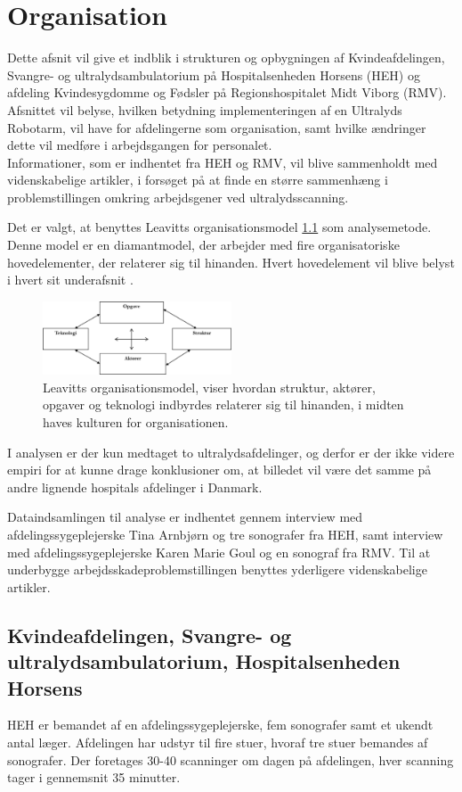 \chapter{Organisation}
Dette afsnit vil give et indblik i strukturen og opbygningen af Kvindeafdelingen, Svangre- og ultralydsambulatorium på Hospitalsenheden Horsens (HEH) og afdeling Kvindesygdomme og Fødsler på Regionshospitalet Midt Viborg (RMV). Afsnittet vil belyse, hvilken betydning implementeringen af en Ultralyds Robotarm, vil have for afdelingerne som organisation, samt hvilke ændringer dette vil medføre i arbejdsgangen for personalet. \\
Informationer, som er indhentet fra HEH og RMV, vil blive sammenholdt med videnskabelige artikler, i forsøget på at finde en større sammenhæng i problemstillingen omkring arbejdsgener ved ultralydsscanning. 

Det er valgt, at benyttes Leavitts organisationsmodel \ref{LeavittModel} som analysemetode. Denne model er en diamantmodel, der arbejder med fire organisatoriske hovedelementer, der relaterer sig til hinanden. Hvert hovedelement vil blive belyst i hvert sit underafsnit \cite{Leavitt}.

\begin{figure}[h!]\centering
	\includegraphics[width = 0.5\textwidth]{Figurer/LeavittModel}
	\caption{Leavitts organisationsmodel, viser hvordan struktur, aktører, opgaver og teknologi indbyrdes relaterer sig til hinanden, i midten haves kulturen for organisationen.}
	\label{LeavittModel}
\end{figure}
I analysen er der kun medtaget to ultralydsafdelinger, og derfor er der ikke videre empiri for at kunne drage konklusioner om, at billedet vil være det samme på andre lignende hospitals afdelinger i Danmark. 

Dataindsamlingen til analyse er indhentet gennem interview med afdelingssygeplejerske Tina Arnbjørn og tre sonografer fra HEH, samt interview med afdelingssygeplejerske Karen Marie Goul og en sonograf fra RMV.
Til at underbygge arbejdsskadeproblemstillingen benyttes yderligere videnskabelige artikler.

\section{Kvindeafdelingen, Svangre- og ultralydsambulatorium, Hospitalsenheden Horsens}
HEH er bemandet af en afdelingssygeplejerske, fem sonografer samt et ukendt antal læger. Afdelingen har udstyr til fire stuer, hvoraf tre stuer bemandes af sonografer. Der foretages 30-40 scanninger om dagen på afdelingen, hver scanning tager i gennemsnit 35 minutter.

